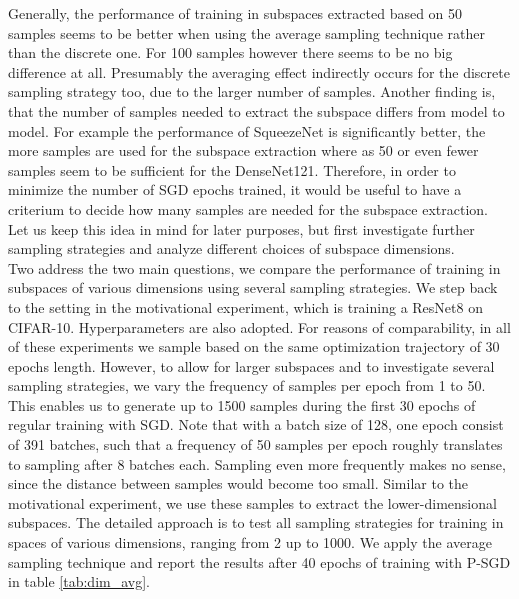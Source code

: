 \documentclass[11pt, a4paper]{article}
\begin{document}
Generally, the performance of training in subspaces extracted based on 50 samples seems to be better when using the average sampling technique rather than the discrete one. For 100 samples however there seems to be no big difference at all. Presumably the averaging effect indirectly occurs for the discrete sampling strategy too, due to the larger number of samples.  Another finding is, that the number of samples needed to extract the subspace differs from model to model. For example the performance of SqueezeNet is significantly better, the more samples are used for the subspace extraction where as 50 or even fewer samples seem to be sufficient for the DenseNet121. Therefore, in order to minimize the number of SGD epochs trained, it would be useful to have a criterium to decide how many samples are needed for the subspace extraction. Let us keep this idea in mind for later purposes, but first investigate further sampling strategies and analyze different choices of subspace dimensions. \\

Two address the two main questions, we compare the performance of training in subspaces of various dimensions using several sampling strategies. We step back to the setting in the motivational experiment, which is training a ResNet8 on CIFAR-10. Hyperparameters are also adopted. For reasons of comparability, in all of these experiments we sample based on the same optimization trajectory of 30 epochs length. However, to allow for larger subspaces and to investigate several sampling strategies, we vary the frequency of samples per epoch from 1 to 50. This enables us to generate up to 1500 samples during the first 30 epochs of regular training with SGD. Note that with a batch size of 128, one epoch consist of 391 batches, such that a frequency of 50 samples per epoch roughly translates to sampling after 8 batches each. Sampling even more frequently makes no sense, since the distance between samples would become too small. Similar to the motivational experiment, we use these samples to extract the lower-dimensional subspaces. The detailed approach is to test all sampling strategies for training in spaces of various dimensions, ranging from 2 up to 1000. We apply the average sampling technique and report the results after 40 epochs of training with P-SGD in table \ref{tab:dim_avg}.
\end{document}

